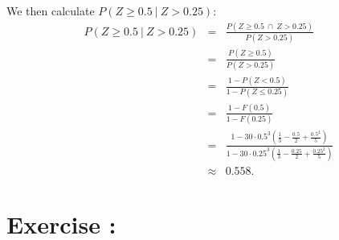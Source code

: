 \documentclass[12pt,thmsa]{article}\usepackage[]{graphicx}\usepackage[]{color}
\begin{document}
\begin{enumerate}
We then calculate $P ( Z \ge 0.5 \ | \ Z > 0.25)$:
   \begin{eqnarray*}
     P ( Z \ge 0.5 \ | \ Z > 0.25) &=& \frac{P(Z \ge 0.5 \ \cap \ Z >
       0.25)}{P(Z > 0.25)} \\
     &=& \frac{P(Z \ge 0.5)}{P(Z > 0.25)} \\
     &=& \frac{1-P(Z<0.5)}{1-P(Z\le 0.25)} \\
     &=& \frac{1-F(0.5)}{1-F(0.25)} \\
     &=& \frac{1-30 \cdot 0.5^3 \left(\frac{1}{3}-\frac{0.5}{2} +
         \frac{0.5^2}{5}\right)}{1-30 \cdot 0.25^3 \left( \frac{1}{3} -
         \frac{0.25}{2} + \frac{0.25^2}{5}\right)} \\
     &\approx& {0.558}.
   \end{eqnarray*}
\end{enumerate}

\addtocounter{section}{1}
\section*{Exercise \thesection:}
\end{document}
